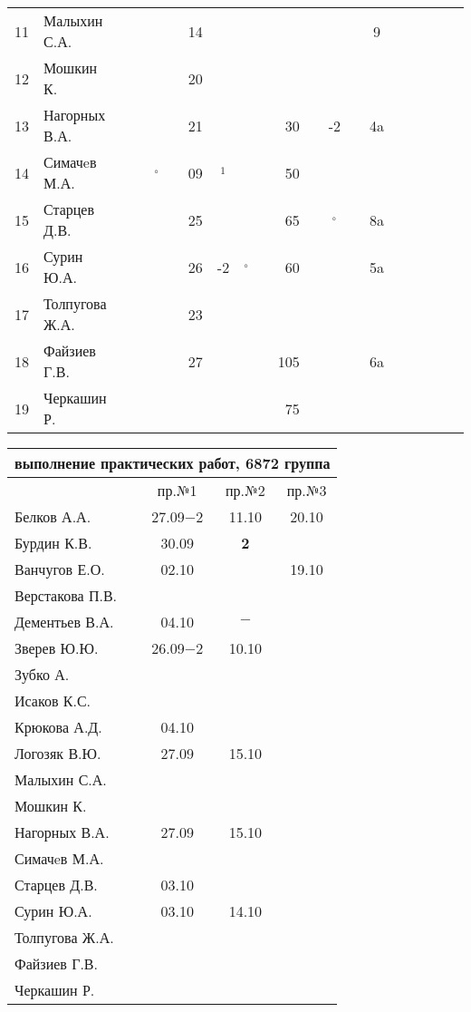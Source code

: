 \documentclass[a4paper,11pt]{article}
\newcommand*\OK{&\small \ding{51}$\!\!_\circ$} %
\newcommand*\Ok{&\small \ding{51}$\!\!_\circ$} %
\newcommand*\ok{&{\small\ding{51}}} %
\newcommand*\no{&{\small }} %
\newcommand*\da{&{\small\ding{48}$\!\!_1$}} %
\begin{document}
\begin{tabular}{l|l|ccccccccrccccccccc}
11& Малыхин С.А.     \ok\no\ok\ok&14\no\no\no \no\no\ok\ok&  9\no&&&\\
12& Мошкин К.        \ok\ok\ok\ok&20\ok\no\no \no\no\no\ok \no\no&&&\\
13& Нагорных В.А.    \ok\ok\ok\ok&21\ok\ok\ok& 30\ok&-2\ok& 4a\ok&&&\\
14& Симачeв М.А.     \ok\ok\OK\ok&09\da\no\no& 50\no\no\no \no\no&&&\\
15& Старцев Д.В.     \ok\ok\ok\ok&25\ok\ok\ok& 65\ok\Ok\ok& 8a\ok&&&\\
16& Сурин Ю.А.       \ok\ok\ok\ok&26&-2\OK\ok& 60\ok\ok\ok& 5a\ok&&&\\
17& Толпугова Ж.А.   \no\no\no\no&23\ok\no\no \no\no\no\no\no\no&&&\\
18& Файзиев Г.В.     \ok\ok\ok\ok&27\ok\ok\ok&105\ok\ok\ok& 6a\ok&&&\\
19& Черкашин Р.      \ok\ok\ok\ok\no\no\no\no& 75\no\ok\ok \no\no&&&\\ 
\bottomrule
\end{tabular} 

\newpage
\begin{tabular}{l|ccc}
\multicolumn{4}{c}{выполнение практических работ, 6872 группа} \\
\toprule
& пр.№1 & пр.№2 & пр.№3 \\
\midrule
Белков А.А.    &27.09$-2$&11.10  &20.10\\   
Бурдин К.В.    &30.09    &{\bf 2}&\\
Ванчугов Е.О.  &02.10    &       &19.10\\
Верстакова П.В.&         &       &\\
Дементьев В.А. &04.10    &$-$    &\\
Зверев Ю.Ю.    &26.09$-2$&10.10  &\\
Зубко А.       &         &       &\\
Исаков К.С.    &         &       &\\
Крюкова А.Д.   &04.10    &       &\\
Логозяк В.Ю.   &27.09    &15.10  &\\
Малыхин С.А.   &         &       &\\
Мошкин К.      &         &       &\\
Нагорных В.А.  &27.09    &15.10  &\\
Симачeв М.А.   &         &       &\\
Старцев Д.В.   &03.10    &       &\\
Сурин Ю.А.     &03.10    &14.10  &\\
Толпугова Ж.А. &         &       &\\
Файзиев Г.В.   &         &       &\\
Черкашин Р.    &         &       &\\
\bottomrule
\end{tabular}
\end{document}
